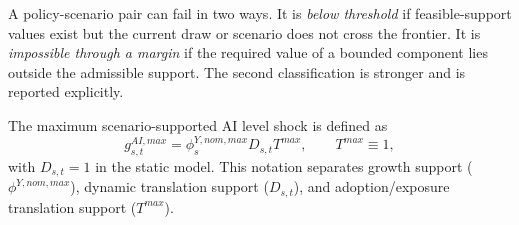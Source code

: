 \documentclass[11pt,a4paper]{article}
\begin{document}
A policy-scenario pair can fail in two ways. It is \emph{below threshold} if feasible-support values exist but the current draw or scenario does not cross the frontier. It is \emph{impossible through a margin} if the required value of a bounded component lies outside the admissible support. The second classification is stronger and is reported explicitly.

The maximum scenario-supported AI level shock is defined as
\begin{equation}
    g^{AI,max}_{s,t}=\phi^{Y,nom,max}_sD_{s,t}T^{max},\qquad T^{max}\equiv1,
\end{equation}
with $D_{s,t}=1$ in the static model. This notation separates growth support ($\phi^{Y,nom,max}$), dynamic translation support ($D_{s,t}$), and adoption/exposure translation support ($T^{max}$).
\end{document}
